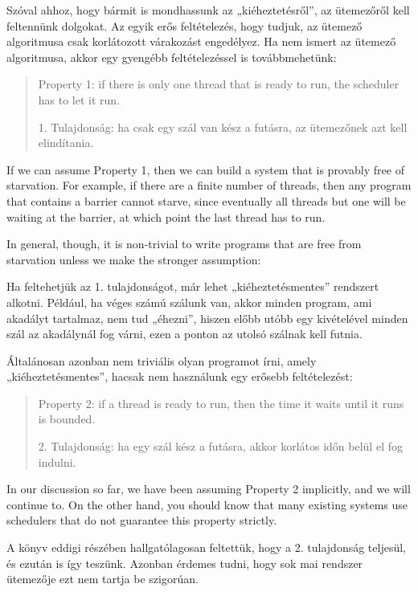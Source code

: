 \documentclass{book}
\begin{document}
Szóval ahhoz, hogy bármit is mondhassunk az „kiéheztetésről”, az ütemezőről kell
feltennünk dolgokat. Az egyik erős feltételezés, hogy tudjuk, az
ütemező algoritmusa csak korlátozott várakozást engedélyez.
Ha nem ismert az ütemező algoritmusa, akkor egy gyengébb
feltételezéssel is továbbmehetünk:

\begin{quote}
Property 1: if there is only one thread that is ready to
run, the scheduler has to let it run.

1. Tulajdonság: ha csak egy szál van kész a futásra, az ütemezőnek azt
kell elindítania.
\end{quote}

If we can assume Property 1, then we can build a system
that is provably free of starvation.  For example, if there
are a finite number of threads, then any program that contains
a barrier cannot starve, since eventually all threads but one
will be waiting at the barrier, at which point the last thread
has to run.

In general, though, it is non-trivial to write programs that
are free from starvation unless we make the stronger
assumption:

Ha feltehetjük az 1. tulajdonságot, már lehet „kiéheztetésmentes” rendszert alkotni.
Például, ha véges számú szálunk van, akkor minden program, ami akadályt tartalmaz,
nem tud „éhezni”, hiszen előbb utóbb egy kivételével minden szál az
akadálynál fog várni, ezen a ponton az utolsó szálnak kell futnia.

Általánosan azonban nem triviális olyan programot írni, amely
„kiéheztetésmentes”, hacsak nem használunk egy erősebb feltételezést:

\begin{quote}
Property 2: if a thread is ready to run, then the time it
waits until it runs is bounded.

2. Tulajdonság: ha egy szál kész a futásra, akkor korlátos időn
belül el fog indulni.
\end{quote}

In our discussion so far, we have been assuming Property 2
implicitly, and we will continue to.  On the other hand,
you should know that many existing systems use schedulers
that do not guarantee this property strictly.

A könyv eddigi részében hallgatólagosan feltettük, hogy a
2. tulajdonság teljesül, és ezután is így teszünk.
Azonban érdemes tudni, hogy sok mai
rendszer ütemezője ezt nem tartja be szigorúan.
\end{document}
